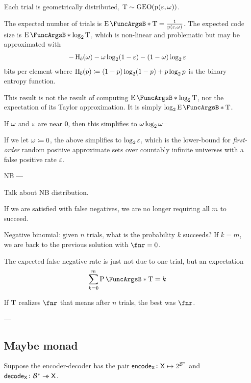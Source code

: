 \documentclass[11pt,final,hidelinks]{article}
\providecommand{\Encode}{\mathsf{encode}}
\providecommand{\Decode}{\mathsf{decode}}
\begin{document}
Each trial is geometrically distributed, $\RV{T} \sim \geodist(\Fun{p}(\fprate,\fnrate))$.



The expected number of trials is $\Expect{\RV{T}} = \frac{1}{\Fun{p}(\fprate,\fnrate)}$.
The expected code size is $\Expect{\log_2 \RV{T}}$, which is non-linear and problematic but may be approximated with
\begin{equation}
	-\Fun{H}_b(\fnrate) - \fnrate \log_2 (1-\fprate) - (1-\fnrate) \log_2 \fprate
\end{equation}
bits per element where $\Fun{H}_b(p) \coloneqq (1-p)\log_2(1-p) + p \log_2 p$ is the binary entropy function.

This result is not the result of computing $\Expect{\log_2 \RV{T}}$, nor the expectation of its Taylor approximation.
It is simply $\log_2 \Expect{\RV{T}}$.

If $\omega$ and $\varepsilon$ are near $0$, then this simplifies to $\omega \log_2 \omega - $

If we let $\omega \coloneqq 0$, the above simplifies to $\log_2 \varepsilon$, which is the lower-bound for \emph{first-order} random positive approximate sets over countably infinite universes with a false positive rate $\varepsilon$.


NB
---

Talk about NB distribution.

If we are satisfied with false negatives, we are no longer requiring all $m$ to succeed.

Negative binomial: given $n$ trials, what is the probability $k$ succeeds? If $k=m$, we are back to the previous solution with $\fnr = 0$.

The expected false negative rate is just not due to one trial, but an expectation
\begin{equation}
	\sum_{k=0}^{m} \Prob{\RV{T} = k} 
\end{equation}

If $\mathrm{T}$ realizes $\fnr$ that means after $n$ trials, the best was $\fnr$.


---





\subsection{Maybe monad}
Suppose the encoder-decoder has the pair $\Encode_{\Set{X}} \colon \Set{X} \mapsto \PS{\BitSet^*}$ and $\Decode_{\Set{X}} \colon \BitSet^* \pfun \Set{X}$.
\end{document}
